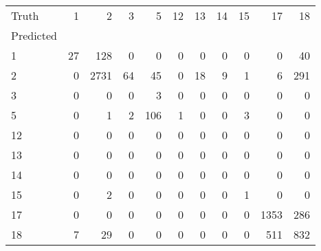 \begin{tabular}{lrrrrrrrrrr}
\toprule
Truth & 1 & 2 & 3 & 5 & 12 & 13 & 14 & 15 & 17 & 18 \\
Predicted &  &  &  &  &  &  &  &  &  &  \\
\midrule
1 & 27 & 128 & 0 & 0 & 0 & 0 & 0 & 0 & 0 & 40 \\
2 & 0 & 2731 & 64 & 45 & 0 & 18 & 9 & 1 & 6 & 291 \\
3 & 0 & 0 & 0 & 3 & 0 & 0 & 0 & 0 & 0 & 0 \\
5 & 0 & 1 & 2 & 106 & 1 & 0 & 0 & 3 & 0 & 0 \\
12 & 0 & 0 & 0 & 0 & 0 & 0 & 0 & 0 & 0 & 0 \\
13 & 0 & 0 & 0 & 0 & 0 & 0 & 0 & 0 & 0 & 0 \\
14 & 0 & 0 & 0 & 0 & 0 & 0 & 0 & 0 & 0 & 0 \\
15 & 0 & 2 & 0 & 0 & 0 & 0 & 0 & 1 & 0 & 0 \\
17 & 0 & 0 & 0 & 0 & 0 & 0 & 0 & 0 & 1353 & 286 \\
18 & 7 & 29 & 0 & 0 & 0 & 0 & 0 & 0 & 511 & 832 \\
\bottomrule
\end{tabular}
